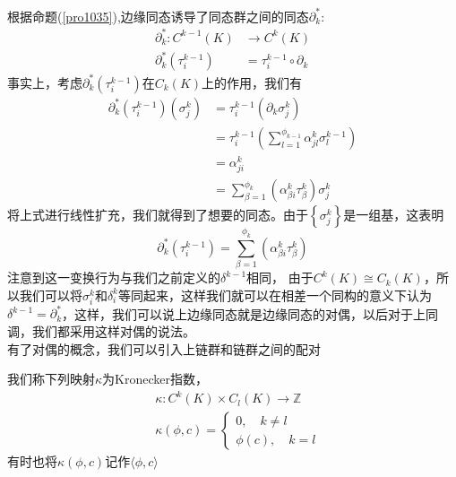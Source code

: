根据命题(\ref{pro1035}),边缘同态诱导了同态群之间的同态$\partial_{k}^{*}$:
\begin{equation*}
\begin{aligned}
    \partial_{k}^{*}:C^{k-1}(K)&\rightarrow C^{k}(K)\\
    \partial_{k}^{*}(\tau^{k-1}_{i})&=\tau^{k-1}_{i}\circ \partial_{k}
    \end{aligned}
\end{equation*}
事实上，考虑$\partial_{k}^{*}(\tau^{k-1}_{i})$在$C_{k}(K)$上的作用，我们有
\begin{equation*}
    \begin{aligned}
    \partial_{k}^{*}(\tau^{k-1}_{i})(\sigma^{k}_{j})&=\tau^{k-1}_{i}(\partial_{k}\sigma^{k}_{j})\\
    &=\tau^{k-1}_{i}(\sum\limits_{l=1}^{\phi_{k-1}}\alpha^{k}_{jl}\sigma_{l}^{k-1})\\
    &=\alpha^{k}_{ji}\\
    &=\sum\limits_{\beta=1}^{\phi_{k}}(\alpha^{k}_{\beta i}\tau^{k}_{\beta})\sigma^{k}_{j}
    \end{aligned}
\end{equation*}
将上式进行线性扩充，我们就得到了想要的同态。由于$\left\{\sigma^{k}_{j}\right\}$是一组基，这表明
\begin{equation*}
    \partial_{k}^{*}(\tau^{k-1}_{i})=\sum\limits_{\beta=1}^{\phi_{k}}(\alpha^{k}_{\beta i}\tau^{k}_{\beta})
\end{equation*}
注意到这一变换行为与我们之前定义的$\delta^{k-1}$相同，
由于$C^{k}(K)\cong C_{k}(K)$，所以我们可以将$\sigma^{k}_{i}$和$\delta^{k}_{i}$等同起来，这样我们就可以在相差一个同构的意义下认为$\delta^{k-1}=\partial_{k}^{*}$，这样，我们可以说上边缘同态就是边缘同态的对偶，以后对于上同调，我们都采用这样对偶的说法。\\
有了对偶的概念，我们可以引入上链群和链群之间的配对
\begin{definition}
我们称下列映射$\kappa$为Kronecker指数，
\begin{equation*}
    \begin{aligned}
    &\kappa:C^{k}(K)\times C_{l}(K)\rightarrow \mathbb{Z}\\
    &\kappa(\phi,c)=\left\{\begin{array}{cc}
         0,\quad k\neq l  \\
         \phi(c),\quad k=l 
    \end{array}\right.
    \end{aligned}
\end{equation*}
有时也将$\kappa(\phi,c)$记作$\langle\phi,c \rangle$
\end{definition}
